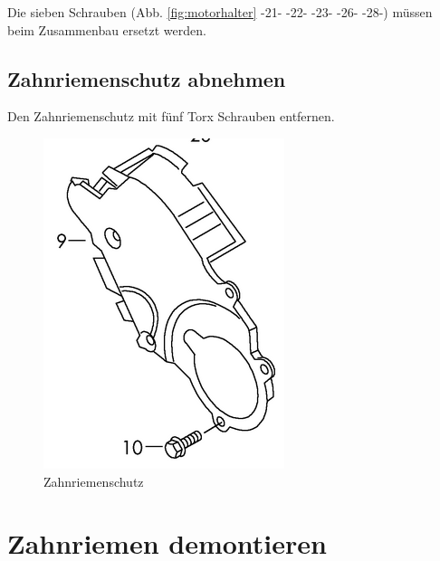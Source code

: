 \documentclass[twoside,a4paper]{refart}
\begin{document}
Die sieben Schrauben (Abb. \ref{fig:motorhalter} -21- -22- -23- -26- -28-) müssen beim Zusammenbau ersetzt werden.

\newpage
\subsection{Zahnriemenschutz abnehmen}
Den Zahnriemenschutz mit fünf Torx Schrauben entfernen.
\begin{figure}[htb]
	\begin{center}
		\includegraphics[width=\textwidth]{Zahnriemenabdeckung}
		\caption{Zahnriemenschutz}
		\label{fig:zahnriemenschutz}
	\end{center}
\end{figure}

\newpage

\section{Zahnriemen demontieren}
\end{document}
